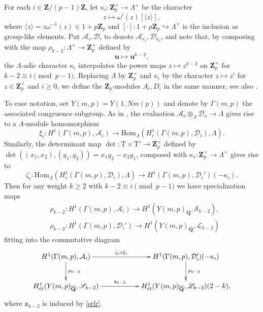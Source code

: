 \documentclass[10pt,letterpaper]{amsart}
\theoremstyle{plain}
\theoremstyle{definition}
\theoremstyle{definition}
\theoremstyle{plain}
\theoremstyle{plain}
\theoremstyle{plain}
\theoremstyle{remark}
\numberwithin{equation}{section}
\DeclareMathOperator{\et}{\acute{e}t}
\def\cA{{\mathcal A}}  %
\def\cD{\mathcal D}
\newcommand{\Q}{\mathbf{Q}}
\newcommand{\Z}{\mathbf{Z}}
\begin{document}
For each $i\in\Z/(p-1)\Z$, let $\kappa_i:\Z_p^\times\rightarrow\Lambda^\times$ be the character  
\[
z\mapsto\omega^i(z)[\langle z\rangle],
\]
where $\langle z\rangle=z\omega^{-1}(z)\in 1+p\Z_p$ and $[\cdot]:1+p\Z_p\hookrightarrow\Lambda^\times$ is the inclusion as group-like elements. Put $\mathcal{A}_i^\cdot,\mathcal{D}_i^\cdot$ to denote $\mathcal{A}_{\kappa_i}^\cdot,\mathcal{D}_{\kappa_i}^\cdot$, and note that, by composing with the map $\rho_{k-2}:\Lambda^\times\rightarrow\Z_p^\times$ defined by \[\mathbf{u}\mapsto\mathbf{u}^{k-2},\] the $\Lambda$-adic character $\kappa_i$ interpolates the power maps $z\mapsto z^{k-2}$ on $\Z_p^\times$ for $k-2\equiv i\pmod{p-1}$. Replacing $\Lambda$ by $\Z_p^\times$ and $\kappa_i$ by the character $z\mapsto z^i$ for $z\in\Z_p^\times$ and $i\geq 0$, we define the $\Z_p$-modules $A_i^\cdot,D_i^\cdot$ in the same manner, see also \cite[\S{5.4}]{ACR}. 

To ease notation, set $Y(m,p)=Y(1,Nm(p))$ and denote by $\Gamma(m,p)$ the associated congruence subgroup. As in \cite[Eq.\,(81) \emph{et seq.}]{BSV}, the evaluation $\mathcal{A}_\kappa^\cdot\otimes_\Lambda\mathcal{D}_\kappa^\cdot\rightarrow\Lambda$ gives rise to a $\Lambda$-module homomorphism
\[
\xi_i:H^1(\Gamma(m,p),\mathcal{A}_i)\rightarrow{\mathrm{Hom}}_\Lambda(H^1_c(\Gamma(m,p),\mathcal{D}_i),\Lambda).
\]
Similarly, the determinant map $\det:\mathrm{T}\times\mathrm{T}'\rightarrow\Z_p^\times$ defined by $\det((x_1,x_2),(y_1,y_2))=x_1y_2-x_2y_1$, composed with $\kappa_i:\Z_p^\times\rightarrow\Lambda^\times$ gives rise to 
\[
\zeta_i:\mathrm{Hom}_{\Lambda}(H^1_c(\Gamma(m,p),\mathcal{D}_i),\Lambda)\rightarrow H^1(\Gamma(m,p),\mathcal{D}_i')(-\kappa_i).
\]
Then for any weight $k\geq 2$ with $k-2\equiv i\pmod{p-1}$ we have specialization maps
\[\begin{aligned}
   &\rho_{k-2}:H^1(\Gamma(m,p),\mathcal{A}_i)\rightarrow H^1_{\et}(Y(m,p)_{\overline{\Q}},\mathscr{S}_{k-2}),\\
   & \rho_{k-2}:H^1(\Gamma(m,p),\mathcal{D}_i')\rightarrow H^1_{\et}(Y(m,p)_{\overline{\Q}},\mathscr{L}_{k-2})
\end{aligned}
\]
fitting into the commutative diagram
\[
\xymatrix{
H^1(\Gamma(m,p),\mathcal{A}_i)\ar[d]^{\rho_{k-2}}\ar[rr]^-{\zeta_i\circ\xi_i}&&H^1(\Gamma(m,p),\mathcal{D}_i')(-\kappa_i)\ar[d]^{\rho_{k-2}}\\
H^1_{\et}(Y(m,p)_{\overline{\Q}},\mathscr{S}_{k-2})\ar[rr]^-{\mathtt{s}_{k-2}}&&H^1_{\et}(Y(m,p)_{\overline{\Q}},\mathscr{L}_{k-2})(2-k),
}
\]
where $\mathtt{s}_{k-2}$ is induced by \eqref{srlr}.
\end{document}
